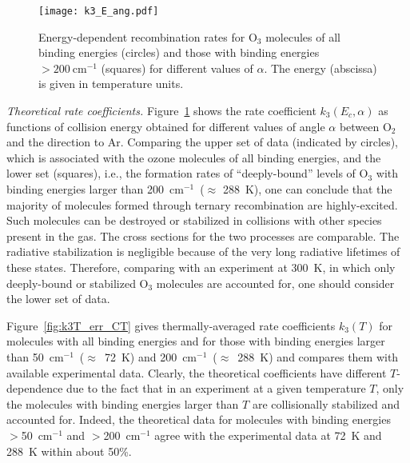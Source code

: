 \documentclass[aps,prl,twocolumn,showpacs,preprintnumbers,amsmath,amssymb,floatfix]{revtex4-2}
\begin{document}
\begin{figure}
	\centering
	\texttt{[image: k3\_E\_ang.pdf]}
	\caption{Energy-dependent recombination rates for O$_3$ molecules of all binding energies (circles) and those with binding energies $>200 ~\mathrm{cm}^{-1}$ (squares) for different values of $\alpha$. The energy (abscissa) is given in temperature units.}
	\label{fig:dif_ang}
\end{figure}


{\it Theoretical rate coefficients.}
Figure~\ref{fig:dif_ang} shows the rate coefficient $k_3(E_c,\alpha)$ as functions of collision energy obtained for different values of angle $\alpha$ between O$_2$ and the direction to Ar. 
Comparing the upper set of data (indicated by circles), which is associated with the ozone molecules of all binding energies, and the lower set (squares), i.e.,  the formation rates of ``deeply-bound'' levels of O$_3$ with binding energies larger than 200~cm$^{-1}$~($\approx$ 288~K), one can conclude that the majority of molecules formed through ternary recombination are highly-excited. Such molecules can be destroyed or stabilized in collisions with other species present in the gas. The cross sections for the two processes are comparable. The radiative stabilization is negligible because of the very long radiative lifetimes of these states. Therefore, comparing with an experiment at 300~K, in which only deeply-bound or stabilized O$_3$ molecules are accounted for, one should consider the lower set of data.







Figure~\ref{fig:k3T_err_CT} gives thermally-averaged  rate coefficients $k_3(T)$ for molecules with all binding energies and for those with binding energies larger than 50~cm$^{-1}$~($\approx$~72~K) and 200~cm$^{-1}$~($\approx$~288~K) and compares them with available experimental data. Clearly, the theoretical coefficients have different $T$-dependence due to the fact that in an experiment at a given temperature $T$, only the molecules with binding energies larger than $T$ are collisionally stabilized and accounted for. Indeed, the theoretical data for molecules with binding energies $>$50~cm$^{-1}$ and $>$200~cm$^{-1}$  agree with the experimental data at 72~K and 288~K within about 50\%. 
\end{document}
